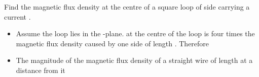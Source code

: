 
\begin{ELexample}{}

Find the magnetic flux density at the centre of a square loop of side  carrying a current .


\begin{ELsolution}

\begin{itemize}
\tightlist
\item
  Assume the loop lies in the -plane.  at the centre of the loop is four times the magnetic flux density caused by one side of length . Therefore
\item
  The magnitude of the magnetic flux density of a straight wire of length  at a distance  from it
\end{itemize}


\end{ELsolution}

\end{ELexample}



